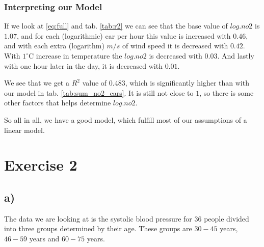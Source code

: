 \documentclass[a4paper,norsk, 10pt]{article}
\begin{document}
\subsubsection*{Interpreting our Model}
If we look at \eqref{eq:full} and tab. \ref{tab:r2} we can see that the base value of $log.no2$ is $1.07$, and for each (logarithmic) car per hour this value is increased with $0.46$, and with each extra (logarithm) $m/s$ of wind speed it is decreased with $0.42$. With $1^{\circ}$C increase in temperature the $log.no2$ is decreased with $0.03$. And lastly with one hour later in the day, it is decreased with $0.01$.

We see that we get a $R^2$ value of $0.483$, which is significantly higher than with our model in tab. \ref{tab:sum_no2_cars}. It is still not close to $1$, so there is some other factors that helps determine $log.no2$.

So all in all, we have a good model, which fulfill most of our assumptions of a linear model.





\section*{Exercise 2}

\subsection*{a)}

The data we are looking at is the systolic blood pressure for $36$ people divided into three groups determined by their age. These groups are $30-45$ years, $46-59$ years and $60-75$ years. 
\end{document}

